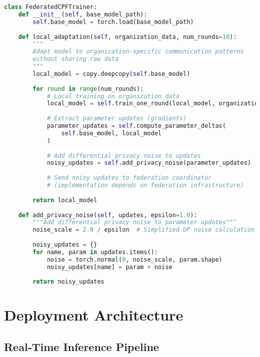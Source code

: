 \documentclass[11pt,a4paper]{article}
\begin{document}
\begin{lstlisting}[language=Python, caption=Federated Fine-Tuning Protocol]
class FederatedCPFTrainer:
    def __init__(self, base_model_path):
        self.base_model = torch.load(base_model_path)
        
    def local_adaptation(self, organization_data, num_rounds=10):
        """
        Adapt model to organization-specific communication patterns
        without sharing raw data
        """
        local_model = copy.deepcopy(self.base_model)
        
        for round in range(num_rounds):
            # Local training on organization data
            local_model = self.train_one_round(local_model, organization_data)
            
            # Extract parameter updates (gradients)
            parameter_updates = self.compute_parameter_deltas(
                self.base_model, local_model
            )
            
            # Add differential privacy noise to updates
            noisy_updates = self.add_privacy_noise(parameter_updates)
            
            # Send noisy updates to federation coordinator
            # (implementation depends on federation infrastructure)
            
        return local_model
        
    def add_privacy_noise(self, updates, epsilon=1.0):
        """Add differential privacy noise to parameter updates"""
        noise_scale = 2.0 / epsilon  # Simplified DP noise calculation
        
        noisy_updates = {}
        for name, param in updates.items():
            noise = torch.normal(0, noise_scale, param.shape)
            noisy_updates[name] = param + noise
            
        return noisy_updates
\end{lstlisting}

\section{Deployment Architecture}

\subsection{Real-Time Inference Pipeline}
\end{document}
